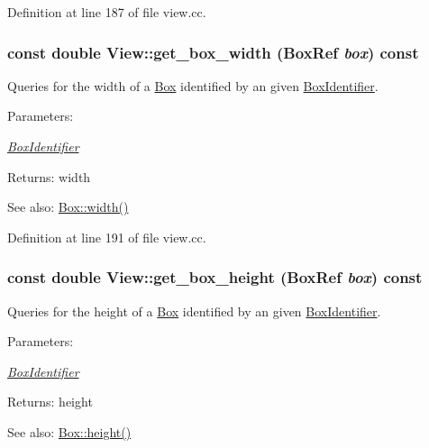 Definition at line 187 of file view.cc.\hypertarget{class_view_4dd52be2f5f895efa82622a0e03057f7}{
\subsubsection[get\_\-box\_\-width]{\setlength{\rightskip}{0pt plus 5cm}const double View::get\_\-box\_\-width (BoxRef {\em box}) const}}
\label{class_view_4dd52be2f5f895efa82622a0e03057f7}


Queries for the width of a \hyperlink{class_box}{Box} identified by an given \hyperlink{class_box_identifier}{BoxIdentifier}. \begin{Desc}
\item[Parameters:]
\begin{description}
\item[{\em \hyperlink{class_box_identifier}{BoxIdentifier}}]\end{description}
\end{Desc}
\begin{Desc}
\item[Returns:]width \end{Desc}
\begin{Desc}
\item[See also:]\hyperlink{class_box_cceec88bdb7cccd65b090837e919982c}{Box::width()} \end{Desc}


Definition at line 191 of file view.cc.\hypertarget{class_view_7b70e3c95c8b45e03230c84b46243cf3}{
\subsubsection[get\_\-box\_\-height]{\setlength{\rightskip}{0pt plus 5cm}const double View::get\_\-box\_\-height (BoxRef {\em box}) const}}
\label{class_view_7b70e3c95c8b45e03230c84b46243cf3}


Queries for the height of a \hyperlink{class_box}{Box} identified by an given \hyperlink{class_box_identifier}{BoxIdentifier}. \begin{Desc}
\item[Parameters:]
\begin{description}
\item[{\em \hyperlink{class_box_identifier}{BoxIdentifier}}]\end{description}
\end{Desc}
\begin{Desc}
\item[Returns:]height \end{Desc}
\begin{Desc}
\item[See also:]\hyperlink{class_box_8b436da1c22ee2335d692fe44c53ce90}{Box::height()} \end{Desc}


